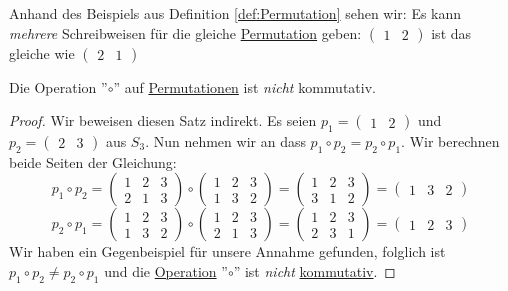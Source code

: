 \documentclass[../../main.tex]{subfiles}
\begin{document}
		\begin{theorem}
			Anhand des Beispiels aus Definition \ref{def:Permutation} sehen wir: Es kann \textit{mehrere} Schreibweisen für die gleiche \hyperref[def:Permutation]{Permutation} geben: $\begin{pmatrix}1 & 2 \end{pmatrix}$ ist das gleiche wie $\begin{pmatrix}2 & 1 \end{pmatrix}$
		\end{theorem}
	
		\begin{theorem}
			Die Operation ''$\circ$'' auf \hyperref[def:Permutation]{Permutationen} ist \textit{nicht} kommutativ.
			\begin{proof}
				Wir beweisen diesen Satz indirekt. Es seien $p_1=\begin{pmatrix}1 & 2\end{pmatrix}$ und $p_2=\begin{pmatrix}2 & 3\end{pmatrix}$ aus $S_3$. Nun nehmen wir an dass $p_1 \circ p_2 = p_2 \circ p_1$. Wir berechnen beide Seiten der Gleichung: 
				$$p_1 \circ p_2 = \begin{pmatrix}1 & 2 & 3 \\ 2 & 1 & 3\end{pmatrix} \circ \begin{pmatrix}1 & 2 & 3 \\ 1 & 3 & 2\end{pmatrix} = \begin{pmatrix}1 & 2 & 3 \\ 3 & 1 & 2\end{pmatrix} = \begin{pmatrix} 1 & 3 & 2\end{pmatrix}$$
				$$p_2 \circ p_1 = \begin{pmatrix}1 & 2 & 3 \\ 1 & 3 & 2\end{pmatrix} \circ \begin{pmatrix}1 & 2 & 3 \\ 2 & 1 & 3\end{pmatrix} = \begin{pmatrix}1 & 2 & 3 \\ 2 & 3 & 1\end{pmatrix} = \begin{pmatrix} 1 & 2 & 3\end{pmatrix}$$
				Wir haben ein Gegenbeispiel für unsere Annahme gefunden, folglich ist $p_1 \circ p_2 \not = p_2 \circ p_1$ und die \hyperref[def:Operation]{Operation} ''$\circ$'' ist \textit{nicht} \hyperref[def:kommutativ]{kommutativ}.
			\end{proof}
		\end{theorem}
	
\end{document}
